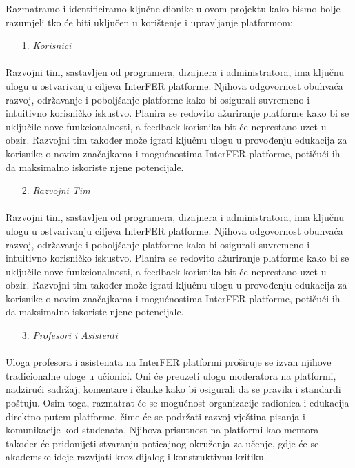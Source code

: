 Razmatramo i identificiramo ključne dionike u ovom projektu kako bismo bolje razumjeli tko će biti uključen u korištenje i upravljanje platformom:

\begin{enumerate}
	\item[1.] \textit{Korisnici}
\end{enumerate}

\paragraph{}
Razvojni tim, sastavljen od programera, dizajnera i administratora, ima ključnu ulogu u ostvarivanju ciljeva InterFER platforme. Njihova odgovornost obuhvaća razvoj, održavanje i poboljšanje platforme kako bi osigurali suvremeno i intuitivno korisničko iskustvo. Planira se redovito ažuriranje platforme kako bi se uključile nove funkcionalnosti, a feedback korisnika bit će neprestano uzet u obzir. Razvojni tim također može igrati ključnu ulogu u provođenju edukacija za korisnike o novim značajkama i mogućnostima InterFER platforme, potičući ih da maksimalno iskoriste njene potencijale.

\begin{enumerate}
	\item[2.] \textit{Razvojni Tim}
\end{enumerate}

\paragraph{}
Razvojni tim, sastavljen od programera, dizajnera i administratora, ima ključnu ulogu u ostvarivanju ciljeva InterFER platforme. Njihova odgovornost obuhvaća razvoj, održavanje i poboljšanje platforme kako bi osigurali suvremeno i intuitivno korisničko iskustvo. Planira se redovito ažuriranje platforme kako bi se uključile nove funkcionalnosti, a feedback korisnika bit će neprestano uzet u obzir. Razvojni tim također može igrati ključnu ulogu u provođenju edukacija za korisnike o novim značajkama i mogućnostima InterFER platforme, potičući ih da maksimalno iskoriste njene potencijale.

\begin{enumerate}
	\item[3.] \textit{Profesori i Asistenti}
\end{enumerate}

\paragraph{}
Uloga profesora i asistenata na InterFER platformi proširuje se izvan njihove tradicionalne uloge u učionici. Oni će preuzeti ulogu moderatora na platformi, nadzirući sadržaj, komentare i članke kako bi osigurali da se pravila i standardi poštuju. Osim toga, razmatrat će se mogućnost organizacije radionica i edukacija direktno putem platforme, čime će se podržati razvoj vještina pisanja i komunikacije kod studenata. Njihova prisutnost na platformi kao mentora također će pridonijeti stvaranju poticajnog okruženja za učenje, gdje će se akademske ideje razvijati kroz dijalog i konstruktivnu kritiku.

